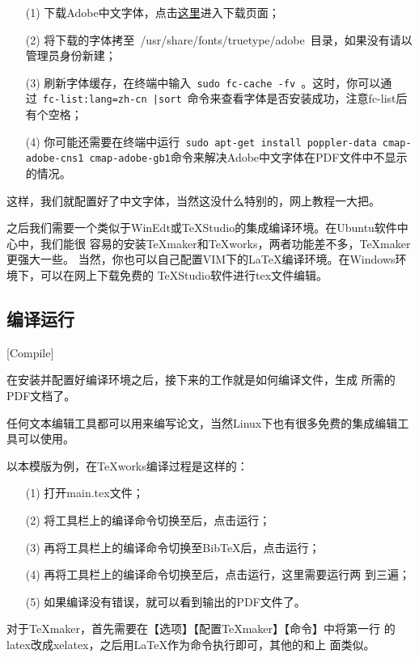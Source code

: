\begin{enumerate}
\item[(1)] 下载Adobe中文字体，点击\href{http://forum.ubuntu.org.cn/viewtopic.php?f=35&t=180987&start=0}{这里}进入下载页面；
\item[(2)] 将下载的字体拷至~{/usr/share/fonts/truetype/adobe}~目录，如果没有请以管理员身份新建；
\item[(3)] 刷新字体缓存，在终端中输入~\texttt{sudo fc-cache -fv }。这时，你可以通过~\texttt{fc-list:lang=zh-cn |sort}~命令来查看字体是否安装成功，注意fc-list后有个空格；
\item[(4)] 你可能还需要在终端中运行~\texttt{sudo apt-get install poppler-data cmap-adobe-cns1 cmap-adobe-gb1}命令来解决Adobe中文字体在PDF文件中不显示的情况。
\end{enumerate}

这样，我们就配置好了中文字体，当然这没什么特别的，网上教程一大把。

之后我们需要一个类似于WinEdt或TeXStudio的集成编译环境。在Ubuntu软件中心中，我们能很
容易的安装\TeX{}maker和\TeX{}works，两者功能差不多，\TeX{}maker更强大一些。
当然，你也可以自己配置VIM下的\LaTeX{}编译环境。在Windows环境下，可以在网上下载免费的
TeXStudio软件进行tex文件编辑。

\subsection{编译运行}[Compile]

在安装并配置好编译环境之后，接下来的工作就是如何编译\XeLaTeX{}文件，生成
所需的PDF文档了。

任何文本编辑工具都可以用来编写论文，当然Linux下也有很多免费的集成编辑工具可以使用。

以本模版为例，在\TeX{}works编译过程是这样的：
\begin{enumerate}
\item[(1)] 打开main.tex文件；
\item[(2)] 将工具栏上的编译命令切换至\XeLaTeX{}后，点击运行；
\item[(3)] 再将工具栏上的编译命令切换至Bib\TeX{}后，点击运行；
\item[(4)] 再将工具栏上的编译命令切换至\XeLaTeX{}后，点击运行，这里需要运行两
  到三遍；
\item[(5)] 如果编译没有错误，就可以看到输出的PDF文件了。
\end{enumerate}

对于\TeX{}maker，首先需要在【选项】【配置\TeX{}maker】【命令】中将第一行
的latex改成xelatex，之后用\LaTeX{}作为\XeLaTeX{}命令执行即可，其他的和上
面类似。

